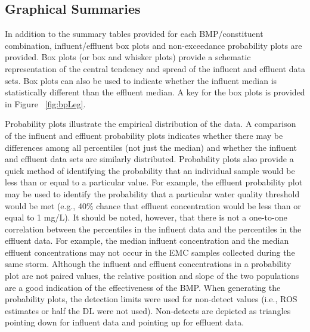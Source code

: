 



\subsection{Graphical Summaries}
In addition to the summary tables provided for each BMP/constituent
combination, influent/effluent box plots and non-exceedance probability
plots are provided. Box plots (or box and whisker plots) provide a schematic
representation of the central tendency and spread of the influent and effluent
data sets. Box plots can also be used to indicate whether the influent median
is statistically different than the effluent median. A key for the box plots
is provided in Figure ~\ref{fig:bpLeg}.

Probability plots illustrate the empirical distribution of the data.  A
comparison of the influent and effluent probability plots indicates whether
there may be differences among all percentiles (not just the median) and
whether the influent and effluent data sets are similarly distributed.
Probability plots also provide a quick method of identifying the probability
that an individual sample would be less than or equal to a particular value.
For example, the effluent probability plot may be used to identify the
probability that a particular water quality threshold would be met (e.g., 40\%
chance that effluent concentration would be less than or equal to 1 mg/L). It
should be noted, however, that there is not a one-to-one correlation between
the percentiles in the influent data and the percentiles in the effluent data.
For example, the median influent concentration and the median effluent
concentrations may not occur in the EMC samples collected during the same
storm. Although the influent and effluent concentrations in a probability plot
are not paired values, the relative position and slope of the two populations
are a good indication of the effectiveness of the BMP. When generating the
probability plots, the detection limits were used for non-detect values (i.e.,
ROS estimates or half the DL were not used).  Non-detects are depicted as
triangles pointing down for influent data and pointing up for effluent data.

